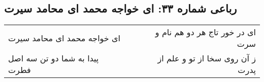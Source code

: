 \begin{center}
\section*{رباعی شماره ۳۳: ای خواجه محمد ای محامد سیرت}
\label{sec:sh033}
\begin{longtable}{l p{0.5cm} r}
ای خواجه محمد ای محامد سیرت
&&
ای در خور تاج هر دو هم نام و سرت
\\
پیدا به شما دو تن سه اصل فطرت
&&
ز آن روی سخا از تو و علم از پدرت
\\
\end{longtable}
\end{center}
